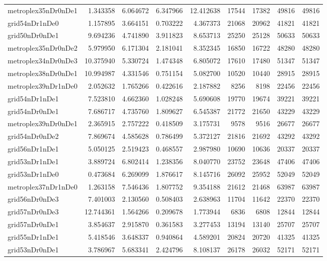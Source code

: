 \begin{longtable}{|l|r|r|r|r|r|r|r|r|}
metroplex35nDr0nDe1 & 1.343358 & 6.064672 & 6.347966 & 12.412638 & 17544 & 17382 & 49816 & 49816 \\
grid54nDr1nDe0 & 1.157895 & 3.664151 & 0.703222 & 4.367373 & 21068 & 20962 & 41821 & 41821 \\
grid50nDr0nDe1 & 9.694236 & 4.741890 & 3.911823 & 8.653713 & 25250 & 25128 & 50633 & 50633 \\
metroplex35nDr0nDe2 & 5.979950 & 6.171304 & 2.181041 & 8.352345 & 16850 & 16722 & 48280 & 48280 \\
metroplex34nDr0nDe3 & 10.375940 & 5.330724 & 1.474348 & 6.805072 & 17610 & 17480 & 51347 & 51347 \\
metroplex38nDr0nDe1 & 10.994987 & 4.331546 & 0.751154 & 5.082700 & 10520 & 10440 & 28915 & 28915 \\
metroplex39nDr1nDe0 & 2.052632 & 1.765266 & 0.422616 & 2.187882 & 8256 & 8198 & 22456 & 22456 \\
grid54nDr1nDe1 & 7.523810 & 4.662360 & 1.028248 & 5.690608 & 19770 & 19674 & 39221 & 39221 \\
grid54nDr0nDe1 & 7.686717 & 4.735760 & 1.809627 & 6.545387 & 21772 & 21650 & 43229 & 43229 \\
metroplex39nDr0nDe1 & 2.365915 & 2.757222 & 0.418509 & 3.175731 & 9578 & 9516 & 26677 & 26677 \\
grid54nDr0nDe2 & 7.869674 & 4.585628 & 0.786499 & 5.372127 & 21816 & 21692 & 43292 & 43292 \\
grid56nDr1nDe1 & 5.050125 & 2.519423 & 0.468557 & 2.987980 & 10690 & 10636 & 20337 & 20337 \\
grid53nDr1nDe1 & 3.889724 & 6.802414 & 1.238356 & 8.040770 & 23752 & 23648 & 47406 & 47406 \\
grid53nDr1nDe0 & 0.473684 & 6.269099 & 1.876617 & 8.145716 & 26092 & 25952 & 52049 & 52049 \\
metroplex37nDr1nDe0 & 1.263158 & 7.546436 & 1.807752 & 9.354188 & 21612 & 21468 & 63987 & 63987 \\
grid56nDr0nDe3 & 7.401003 & 2.130560 & 0.508403 & 2.638963 & 11704 & 11642 & 22370 & 22370 \\
grid57nDr0nDe3 & 12.744361 & 1.564266 & 0.209678 & 1.773944 & 6836 & 6808 & 12844 & 12844 \\
grid57nDr0nDe1 & 3.854637 & 2.915870 & 0.361583 & 3.277453 & 13194 & 13140 & 25707 & 25707 \\
grid55nDr1nDe1 & 5.418546 & 3.648337 & 0.940864 & 4.589201 & 20824 & 20720 & 41325 & 41325 \\
grid53nDr0nDe1 & 3.786967 & 5.683341 & 2.424796 & 8.108137 & 26178 & 26032 & 52171 & 52171 \\

\end{longtable}

